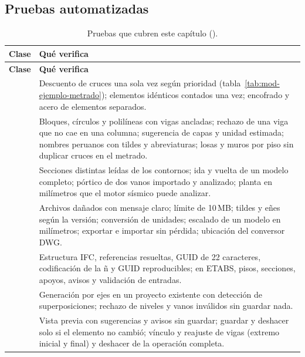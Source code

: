 \subsection{Pruebas automatizadas}
\label{sec:mod-pruebas}

\begin{longtable}{L{6.6cm}L{7.2cm}}
	\caption{Pruebas que cubren este capítulo ().} \label{tab:mod-pruebas} \\
	\hline
	\textbf{Clase} & \textbf{Qué verifica} \\ \hline
	\endfirsthead
	\hline
	\textbf{Clase} & \textbf{Qué verifica} \\ \hline
	\endhead
	\hline
	\endfoot
	 & Descuento de cruces una sola vez según prioridad (tabla~\ref{tab:mod-ejemplo-metrado});
	elementos idénticos contados una vez; encofrado y acero de elementos separados. \\
	 & Bloques, círculos y polilíneas con vigas ancladas; rechazo de una viga que no cae en una
	columna; sugerencia de capas y unidad estimada; nombres peruanos con tildes y abreviaturas; losas y muros por piso
	sin duplicar cruces en el metrado. \\
	 & Secciones distintas leídas de los contornos; ida y vuelta de un modelo completo; pórtico
	de dos vanos importado y analizado; planta en milímetros que el motor sísmico puede analizar. \\
	 & Archivos dañados con mensaje claro; límite de 10\,MB; tildes y eñes según la versión;
	conversión de unidades; escalado de un modelo en milímetros; exportar e importar sin pérdida; ubicación del
	conversor DWG. \\
	 & Estructura IFC, referencias resueltas, GUID de 22 caracteres, codificación de la
	ñ y GUID reproducibles; en ETABS, pisos, secciones, apoyos, avisos y validación de entradas. \\
	 & Generación por ejes en un proyecto existente con detección de superposiciones;
	rechazo de niveles y vanos inválidos sin guardar nada. \\
	 & Vista previa con sugerencias y avisos sin guardar; guardar y deshacer
	solo si el elemento no cambió; vínculo y reajuste de vigas (extremo inicial y final) y deshacer de la operación
	completa. \\

\end{longtable}
